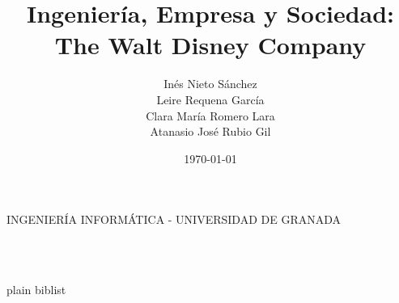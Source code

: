 \documentclass [12pt, spanish] {article}
\title {
	Ingeniería, Empresa y Sociedad: \\
	The Walt Disney Company
	\hspace {0.05cm}
}
\author {
	Inés Nieto Sánchez \\
	Leire Requena García \\
	Clara María Romero Lara \\
	Atanasio José Rubio Gil
}
\date {\today}
\makeatletter
\let\thetitle\@title
\let\theauthor\@author
\let\thedate\@date
\makeatother
\begin{document}

\begin {titlepage}
	\begin {center}
		\vspace* {8 cm}
		\textsc {INGENIERÍA INFORMÁTICA - UNIVERSIDAD DE GRANADA} \\
		{\huge \bfseries \thetitle} \\ [8 cm]
	\end {center}

	\begin {flushright}
		\large \theauthor \\ [0.973 cm]
	\end {flushright}

	\begin {center}
		\large \thedate
	\end {center}
\end {titlepage}


\tableofcontents
\pagebreak



\pagebreak


\pagebreak


	
	
	
	
	
\pagebreak


	
	
	
	
	
	
\pagebreak
	

	
	
	
\pagebreak
	

	
	
	
		
		
	
		
		
	
		
		
		
	
		
		
	
	
\pagebreak


	
	
\pagebreak


 {plain}
 {biblist}
\end{document}

